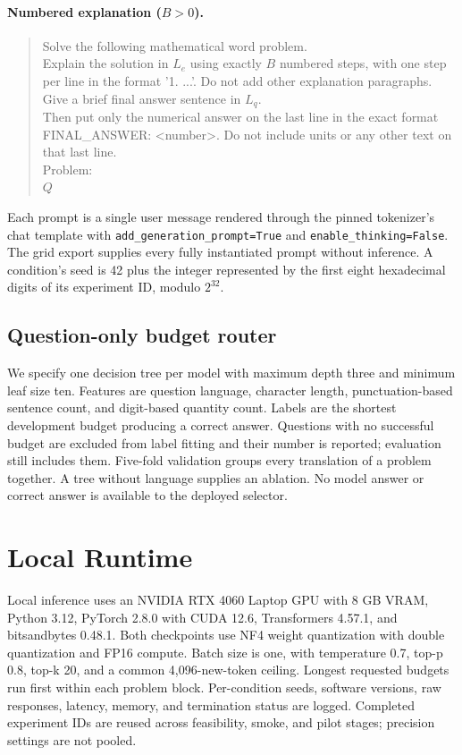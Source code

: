 \documentclass[11pt]{article}
\begin{document}
\paragraph{Numbered explanation ($B>0$).}
\begin{quote}\small\ttfamily
Solve the following mathematical word problem.\\
Explain the solution in $L_e$ using exactly $B$ numbered steps, with one step per line in the format '1. ...'. Do not add other explanation paragraphs.\\
Give a brief final answer sentence in $L_q$.\\
Then put only the numerical answer on the last line in the exact format FINAL\_ANSWER: <number>. Do not include units or any other text on that last line.\\[0.5em]
Problem:\\
$Q$
\end{quote}

Each prompt is a single user message rendered through the pinned tokenizer's chat template with \texttt{add\_generation\_prompt=True} and \texttt{enable\_thinking=False}. The grid export supplies every fully instantiated prompt without inference. A condition's seed is 42 plus the integer represented by the first eight hexadecimal digits of its experiment ID, modulo $2^{32}$.

\subsection{Question-only budget router}
We specify one decision tree per model with maximum depth three and minimum leaf size ten. Features are question language, character length, punctuation-based sentence count, and digit-based quantity count. Labels are the shortest development budget producing a correct answer. Questions with no successful budget are excluded from label fitting and their number is reported; evaluation still includes them. Five-fold validation groups every translation of a problem together. A tree without language supplies an ablation. No model answer or correct answer is available to the deployed selector.

\section{Local Runtime}
Local inference uses an NVIDIA RTX 4060 Laptop GPU with 8 GB VRAM, Python 3.12, PyTorch 2.8.0 with CUDA 12.6, Transformers 4.57.1, and bitsandbytes 0.48.1. Both checkpoints use NF4 weight quantization with double quantization and FP16 compute. Batch size is one, with temperature 0.7, top-p 0.8, top-k 20, and a common 4,096-new-token ceiling. Longest requested budgets run first within each problem block. Per-condition seeds, software versions, raw responses, latency, memory, and termination status are logged. Completed experiment IDs are reused across feasibility, smoke, and pilot stages; precision settings are not pooled.
\end{document}
